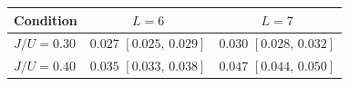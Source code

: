 \begin{tabular}{l cc}
\toprule
Condition & $L=6$ & $L=7$ \\
\midrule
$J/U=0.30$ & $0.027$ $[0.025,\,0.029]$ & $0.030$ $[0.028,\,0.032]$ \\
$J/U=0.40$ & $0.035$ $[0.033,\,0.038]$ & $0.047$ $[0.044,\,0.050]$ \\
\bottomrule
\end{tabular}